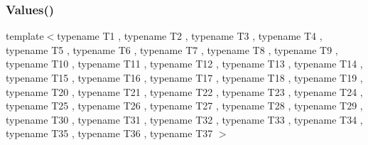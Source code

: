 \subsubsection{\texorpdfstring{Values()}{Values()}\hspace{0.1cm}{\footnotesize\ttfamily [37/50]}}
{\footnotesize\ttfamily template$<$typename T1 , typename T2 , typename T3 , typename T4 , typename T5 , typename T6 , typename T7 , typename T8 , typename T9 , typename T10 , typename T11 , typename T12 , typename T13 , typename T14 , typename T15 , typename T16 , typename T17 , typename T18 , typename T19 , typename T20 , typename T21 , typename T22 , typename T23 , typename T24 , typename T25 , typename T26 , typename T27 , typename T28 , typename T29 , typename T30 , typename T31 , typename T32 , typename T33 , typename T34 , typename T35 , typename T36 , typename T37 $>$ \\
}
